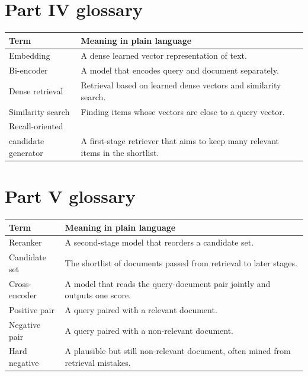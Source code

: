 \documentclass[11pt,oneside]{report}
\begin{document}
\chapter*{Part IV glossary}
\begin{longtable}{p{}p{}}
\toprule
\textbf{Term} & \textbf{Meaning in plain language} \\ \midrule
Embedding & A dense learned vector representation of text. \\ \midrule
Bi-encoder & A model that encodes query and document separately. \\ \midrule
Dense retrieval & Retrieval based on learned dense vectors and similarity search. \\ \midrule
Similarity search & Finding items whose vectors are close to a query vector. \\ \midrule
Recall-oriented\\candidate generator & A first-stage retriever that aims to keep many relevant items in the shortlist. \\
\bottomrule
\end{longtable}


\chapter*{Part V glossary}
\begin{longtable}{p{}p{}}
\toprule
\textbf{Term} & \textbf{Meaning in plain language} \\ \midrule
Reranker & A second-stage model that reorders a candidate set. \\ \midrule
Candidate set & The shortlist of documents passed from retrieval to later stages. \\ \midrule
Cross-encoder & A model that reads the query-document pair jointly and outputs one score. \\ \midrule
Positive pair & A query paired with a relevant document. \\ \midrule
Negative pair & A query paired with a non-relevant document. \\ \midrule
Hard negative & A plausible but still non-relevant document, often mined from retrieval mistakes. \\
\bottomrule
\end{longtable}
\end{document}
